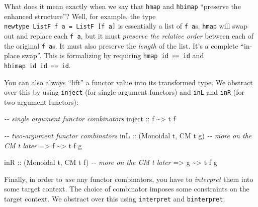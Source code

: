 \documentclass[]{article}
\newenvironment{Shaded}{}{}
\newcommand{\CommentTok}[1]{\textcolor[rgb]{0.38,0.63,0.69}{\textit{#1}}}
\newcommand{\DataTypeTok}[1]{\textcolor[rgb]{0.56,0.13,0.00}{#1}}
\newcommand{\NormalTok}[1]{#1}
\newcommand{\OperatorTok}[1]{\textcolor[rgb]{0.40,0.40,0.40}{#1}}
\newcommand{\OtherTok}[1]{\textcolor[rgb]{0.00,0.44,0.13}{#1}}
\begin{document}
What does it mean exactly when we say that \texttt{hmap} and \texttt{hbimap}
``preserve the enhanced structure''? Well, for example, the type
\texttt{newtype\ ListF\ f\ a\ =\ ListF\ {[}f\ a{]}} is essentially a list of
\texttt{f\ a}s. \texttt{hmap} will swap out and replace each \texttt{f\ a}, but
it must \emph{preserve the relative order} between each of the original
\texttt{f\ a}s. It must also preserve the \emph{length} of the list. It's a
complete ``in-place swap''. This is formalizing by requiring
\texttt{hmap\ id\ ==\ id} and \texttt{hbimap\ id\ id\ ==\ id}.

You can also always ``lift'' a functor value into its transformed type. We
abstract over this by using \texttt{inject} (for single-argument functors) and
\texttt{inL} and \texttt{inR} (for two-argument functors):

\begin{Shaded}
\begin{Highlighting}[]
\CommentTok{{-}{-} single argument functor combinators}
\OtherTok{inject ::}\NormalTok{ f }\OperatorTok{\textasciitilde{}>}\NormalTok{ t f}

\CommentTok{{-}{-} two{-}argument functor combinators}
\OtherTok{inL ::}\NormalTok{ (}\DataTypeTok{Monoidal}\NormalTok{ t, }\DataTypeTok{CM}\NormalTok{ t g)     }\CommentTok{{-}{-} more on the \textasciigrave{}CM t\textasciigrave{} later}
    \OtherTok{=>}\NormalTok{ f }\OperatorTok{\textasciitilde{}>}\NormalTok{ t f g}

\OtherTok{inR ::}\NormalTok{ (}\DataTypeTok{Monoidal}\NormalTok{ t, }\DataTypeTok{CM}\NormalTok{ t f)     }\CommentTok{{-}{-} more on the \textasciigrave{}CM t\textasciigrave{} later}
    \OtherTok{=>}\NormalTok{ g }\OperatorTok{\textasciitilde{}>}\NormalTok{ t f g}
\end{Highlighting}
\end{Shaded}

Finally, in order to \emph{use} any functor combinators, you have to
\emph{interpret} them into some target context. The choice of combinator imposes
some constraints on the target context. We abstract over this using
\texttt{interpret} and \texttt{binterpret}:
\end{document}
